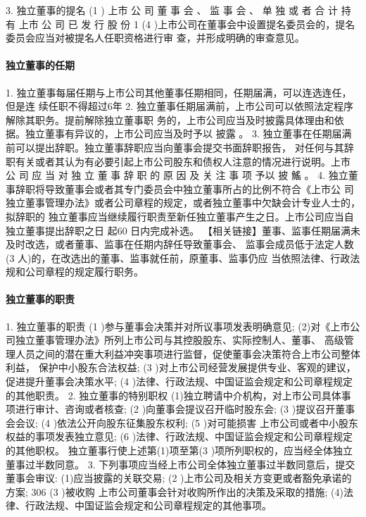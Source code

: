 \documentclass[UTF8,12pt]{ctexart}
\numberwithin{equation}{section} %
\numberwithin{figure}{section}
\numberwithin{table}{section}
\begin{document}
	
	3. 独立董事的提名
	(1 ) 上市 公 司 董 事 会 、 监 事 会 、 单 独 或 者 合 计 持 有 上市 公 司 已 发 行 股 份 1 %
	(4 )上市公司在董事会中设置提名委员会的，提名委员会应当对被提名人任职资格进行审 查，并形成明确的审查意见。
	
	\paragraph{独立董事的任期}
	
	1. 独立董事每届任期与上市公司其他董事任期相同，任期届满，可以连选连任，但是连 续任职不得超过6年
	2. 独立董事任期届满前，上市公司可以依照法定程序解除其职务。提前解除独立董事职 务的，上市公司应当及时披露具体理由和依据。独立董事有异议的，上市公司应当及时予以 披露 。
	3. 独立董事在任期届满前可以提出辞职。独立董事辞职应当向董事会提交书面辞职报告， 对任何与其辞职有关或者其认为有必要引起上市公司股东和债权人注意的情况进行说明。上市 公 司 应 当 对 独 立 董 事 辞 职 的 原 因 及 关 注 事 项 予以 披 鰩 。
	4. 独立董事辞职将导致董事会或者其专门委员会中独立董事所占的比例不符合《上市公 司独立董事管理办法》或者公司章程的规定，或者独立董事中欠缺会计专业人士的，拟辞职的 独立董事应当继续履行职责至新任独立董事产生之日。上市公司应当自独立董事提出辞职之日 起60 日内完成补选。
	【相关链接】董事、监事任期届满未及时改选，或者董事、监事在任期内辞任导致董事会、 监事会成员低于法定人数(3 人)的，在改选出的董事、监事就任前，原董事、监事仍应 当依照法律、行政法规和公司章程的规定履行职务。
	
	\paragraph{独立董事的职责}
	
	1. 独立董事的职责
	(1 )参与董事会决策并对所议事项发表明确意见; (2)对《上市公司独立董事管理办法》所列上市公司与其控股股东、实际控制人、董事、 高级管理人员之间的潜在重大利益冲突事项进行监督，促使董事会决策符合上市公司整体利益， 保护中小股东合法权益;
	(3 )对上市公司经营发展提供专业、客观的建议，促进提升董事会决策水平;
	(4 )法律、行政法规、中国证监会规定和公司章程规定的其他职责。
	2. 独立董事的特别职权 (1)独立聘请中介机构，对上市公司具体事项进行审计、咨询或者核查;
	(2 )向董事会提议召开临时股东会;
	(3 )提议召开董事会会议;
	(4 )依法公开向股东征集股东权利;
	(5 )对可能损害 上市公司或者中小股东权益的事项发表独立意见;
	(6 )法律、行政法规、中国证监会规定和公司章程规定的其他职权。 独立董事行使上述第(1)项至第(3 )项所列职权的，应当经全体独立董事过半数同意。 3. 下列事项应当经上市公司全体独立董事过半数同意后，提交董事会审议: (1)应当披露的关联交易;
	(2 )上市公司及相关方变更或者豁免承诺的方案;
	306
	(3 )被收购 上市公司董事会针对收购所作出的决策及采取的措施; (4)法律、行政法规、中国证监会规定和公司章程规定的其他事项。
	
\end{document}
